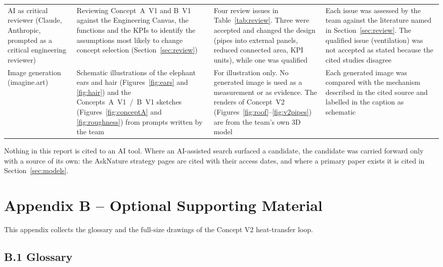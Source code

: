 {\begin{longtable}{L{2.5cm} L{3.5cm} L{3.9cm} L{4.6cm}}
AI as critical reviewer (Claude, Anthropic, prompted as a critical engineering reviewer) &
Reviewing Concept~A~V1 and B~V1 against the Engineering Canvas, the functions and the
KPIs to identify the assumptions most likely to change concept selection
(Section~\ref{sec:review}) &
Four review issues in Table~\ref{tab:review}. Three were accepted and changed the design
(pipes into external panels, reduced connected area, KPI units), while one was qualified &
Each issue was assessed by the team against the literature named in
Section~\ref{sec:review}. The qualified issue (ventilation) was not accepted as stated
because the cited studies disagree \\

Image generation (imagine.art) &
Schematic illustrations of the elephant ears and hair (Figures~\ref{fig:ears} and
\ref{fig:hair}) and the Concepts~A~V1~/~B~V1 sketches (Figures~\ref{fig:conceptA} and \ref{fig:roughness}) from prompts
written by the team &
For illustration only. No generated image is used as a measurement or as evidence. The
renders of Concept~V2 (Figures~\ref{fig:roof}--\ref{fig:v2pipes}) are from the team's
own 3D model &
Each generated image was compared with the mechanism described in the cited source and
labelled in the caption as schematic \\
\end{longtable}}

 Nothing in this report is cited to an AI tool.
Where an AI-assisted search surfaced a candidate, the candidate was carried forward only
with a source of its own: the AskNature strategy pages are cited with their access dates,
and where a primary paper exists it is cited in Section~\ref{sec:models}.

\clearpage
{}
\section*{Appendix B -- Optional Supporting Material}
\label{sec:appendixB}
\renewcommand{\thetable}{B.\arabic{table}}
\setcounter{table}{0}
\renewcommand{\thefigure}{B.\arabic{figure}}
\setcounter{figure}{0}

This appendix collects the glossary and the full-size drawings of the Concept V2
heat-transfer loop.

\subsection*{B.1 Glossary}


